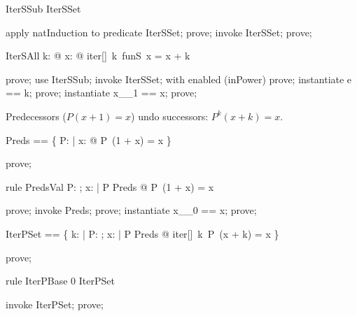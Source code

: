 \documentclass{article}
\begin{document}
\begin{theorem}{IterSSub}
  \nat \subseteq IterSSet
\end{theorem}

\begin{zproof}
apply natInduction to predicate \nat \subseteq IterSSet;
prove;
invoke IterSSet;
prove;
\end{zproof}

\begin{theorem}{IterSAll}
  \forall k: \nat @ \forall x: \nat @ iter[\nat]~k~funS~x = x + k
\end{theorem}

\begin{zproof}
prove;
use IterSSub;
invoke IterSSet;
with enabled (inPower) prove;
instantiate e == k;
prove;
instantiate x\_\_1 == x;
prove;
\end{zproof}

Predecessors ($P(x + 1) = x$) undo successors: $P^k(x + k) = x$.

\begin{zed}
  Preds == \{ P: \nat \fun \nat | \forall x: \nat @ P~(1 + x) = x \}
\end{zed}

\begin{zproof}
prove;
\end{zproof}

\begin{theorem}{rule PredsVal}
  \forall P: \nat \fun \nat; x: \nat | P \in Preds @ P~(1 + x) = x
\end{theorem}

\begin{zproof}
prove;
invoke Preds;
prove;
instantiate x\_\_0 == x;
prove;
\end{zproof}

\begin{zed}
  IterPSet == \{ k: \nat | \forall P: \nat \fun \nat; x: \nat | P \in Preds @ iter[\nat]~k~P~(x + k) = x \}
\end{zed}

\begin{zproof}
prove;
\end{zproof}

\begin{theorem}{rule IterPBase}
  0 \in IterPSet
\end{theorem}

\begin{zproof}
invoke IterPSet;
prove;
\end{zproof}
\end{document}
